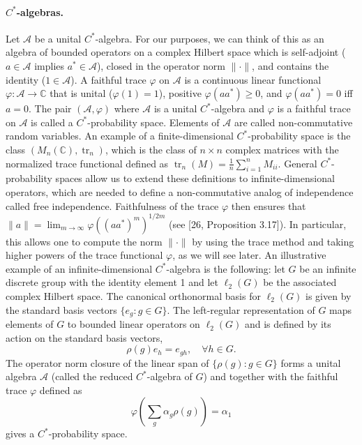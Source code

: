 \documentclass[10pt,a4paper]{article}
\begin{document}
\paragraph{$C^*$-algebras.}
Let $\mathcal A$ be a unital $C^*$-algebra. For our purposes, we can think of this as an algebra of bounded operators on a complex Hilbert space which is self-adjoint ($a\in\mathcal A$ implies $a^*\in\mathcal A$), closed in the operator norm $\|\cdot\|$, and contains the identity ($1\in\mathcal A$). A faithful trace $\varphi$ on $\mathcal A$ is a continuous linear functional $\varphi:\mathcal A\to\mathbb C$ that is unital ($\varphi(1)=1$), positive $\varphi(aa^*)\geq0$, and $\varphi(aa^*)=0$ iff $a=0$.
The pair $(\mathcal A,\varphi)$ where $\mathcal A$ is a unital $C^*$-algebra and $\varphi$ is a faithful trace on $\mathcal A$ is called a $C^*$-probability space. Elements of $\mathcal A$ are called non-commutative random variables. An example of a finite-dimensional $C^*$-probability space is the class $(M_n(\mathbb C),\operatorname{tr}_n)$, which is the class of $n\times n$ complex matrices with the normalized trace functional defined as $\operatorname{tr}_n(M)=\frac1n\sum_{i=1}^nM_{ii}$. General $C^*$-probability spaces allow us to extend these definitions to infinite-dimensional operators, which are needed to define a non-commutative analog of independence called free independence. Faithfulness of the trace $\varphi$ then ensures that $\|a\|=\lim_{m\to\infty}\varphi((aa^*)^m)^{1/2m}$ (see [26, Proposition 3.17]). In particular, this allows one to compute the norm $\|\cdot\|$ by using the trace method and taking higher powers of the trace functional $\varphi$, as we will see later.
An illustrative example of an infinite-dimensional $C^*$-algebra is the following: let $G$ be an infinite discrete group with the identity element 1 and let $\ell_2(G)$ be the associated complex Hilbert space. The canonical orthonormal basis for $\ell_2(G)$ is given by the standard basis vectors $\{e_g:g\in G\}$. The left-regular representation of $G$ maps elements of $G$ to bounded linear operators on $\ell_2(G)$ and is defined by its action on the standard basis vectors,
\[\rho(g)e_h=e_{gh},\quad\forall h\in G.\]
The operator norm closure of the linear span of $\{\rho(g):g\in G\}$ forms a unital algebra $\mathcal A$ (called the reduced $C^*$-algebra of $G$) and together with the faithful trace $\varphi$ defined as
\[\varphi\left(\sum_g\alpha_g\rho(g)\right)=\alpha_1\]
gives a $C^*$-probability space.
\end{document}
